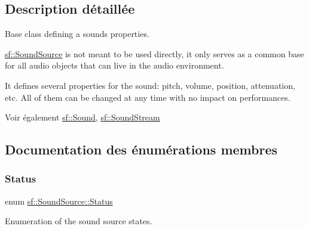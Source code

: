\subsection{Description détaillée}
Base class defining a sound\textquotesingle{}s properties. 

\hyperlink{classsf_1_1SoundSource}{sf\+::\+Sound\+Source} is not meant to be used directly, it only serves as a common base for all audio objects that can live in the audio environment.

It defines several properties for the sound\+: pitch, volume, position, attenuation, etc. All of them can be changed at any time with no impact on performances.

\begin{DoxySeeAlso}{Voir également}
\hyperlink{classsf_1_1Sound}{sf\+::\+Sound}, \hyperlink{classsf_1_1SoundStream}{sf\+::\+Sound\+Stream} 
\end{DoxySeeAlso}


\subsection{Documentation des énumérations membres}
\mbox{\label{classsf_1_1SoundSource_ac43af72c98c077500b239bc75b812f03}} 
\subsubsection{\texorpdfstring{Status}{Status}}
{\footnotesize\ttfamily enum \hyperlink{classsf_1_1SoundSource_ac43af72c98c077500b239bc75b812f03}{sf\+::\+Sound\+Source\+::\+Status}}



Enumeration of the sound source states. 

